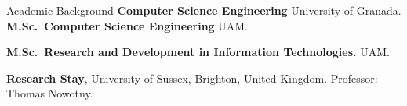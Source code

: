 \begin{rubric}{Academic Background}
\entry*[2014 -- 2018]%
	\textbf{Computer Science Engineering} University of Granada.
%
\entry*[2018 -- 2019]%
	\textbf{M.Sc.~Computer Science Engineering} UAM.\par
\vspace{-3pt}
\entry*[2018 -- 2019]%
	\textbf{M.Sc.~Research and Development in Information Technologies.} UAM.\par

 \textbf{Research Stay}, University of Sussex, Brighton, United Kingdom. Professor: Thomas Nowotny.

\end{rubric}